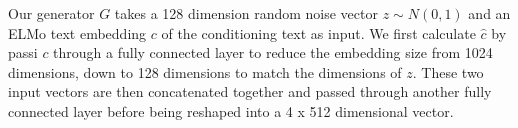 Our generator $G$ takes a 128 dimension random noise vector $z \sim N(0, 1)$ and an ELMo text embedding $c$ of the conditioning text as input. We first calculate $\hat{c}$ by passi $c$ through a fully connected layer to reduce the embedding size from 1024 dimensions, down to 128 dimensions to match the dimensions of $z$. These two input vectors are then concatenated together and passed through another fully connected layer before being reshaped into a 4 x 512 dimensional vector.